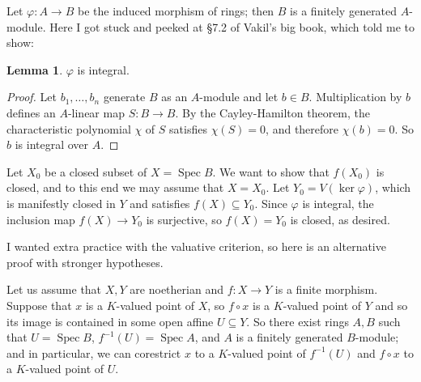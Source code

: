 \documentclass[10pt]{article}
\newcommand{\Spec}{\operatorname{Spec}}
\theoremstyle{definition}
\newtheorem{lemma}{Lemma}[exer]
\begin{document}
Let $\varphi: A \to B$ be the induced morphism of rings; then $B$ is a finitely generated $A$-module.
Here I got stuck and peeked at \S7.2 of Vakil's big book, which told me to show:

\begin{lemma}
$\varphi$ is integral.
\end{lemma}
\begin{proof}
Let $b_1, \dots, b_n$ generate $B$ as an $A$-module and let $b \in B$.
Multiplication by $b$ defines an $A$-linear map $S: B \to B$.
By the Cayley-Hamilton theorem, the characteristic polynomial $\chi$ of $S$ satisfies $\chi(S) = 0$, and therefore $\chi(b) = 0$.
So $b$ is integral over $A$.
\end{proof}

Let $X_0$ be a closed subset of $X = \Spec B$.
We want to show that $f(X_0)$ is closed, and to this end we may assume that $X = X_0$.
Let $Y_0 = V(\ker \varphi)$, which is manifestly closed in $Y$ and satisfies $f(X) \subseteq Y_0$.
Since $\varphi$ is integral, the inclusion map $f(X) \to Y_0$ is surjective, so $f(X) = Y_0$ is closed, as desired.

I wanted extra practice with the valuative criterion, so here is an alternative proof with stronger hypotheses.

Let us assume that $X, Y$ are noetherian and $f: X \to Y$ is a finite morphism.
Suppose that $x$ is a $K$-valued point of $X$, so $f \circ x$ is a $K$-valued point of $Y$ and so its image is contained in some open affine $U \subseteq Y$.
So there exist rings $A, B$ such that $U = \Spec B$, $f^{-1}(U) = \Spec A$, and $A$ is a finitely generated $B$-module; and in particular, we can corestrict $x$ to a $K$-valued point of $f^{-1}(U)$ and $f \circ x$ to a $K$-valued point of $U$.
\end{document}
